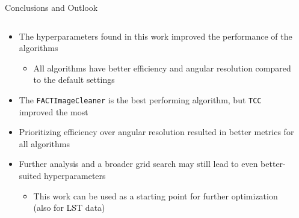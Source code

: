 \begin{frame}[label=summary]{Conclusions and Outlook}
    \begin{columns}
        \begin{column}{0.48\textwidth}
            \begin{itemize}
                \setlength\itemsep{2em}
                \item The hyperparameters found in this work improved the performance of the algorithms
                \begin{itemize}
                    \item [\rightarrow] All algorithms have better efficiency and angular resolution compared to the default settings
                \end{itemize}
                \item The \texttt{FACTImageCleaner} is the best performing algorithm, but \texttt{TCC} improved the most
                \item Prioritizing efficiency over angular resolution resulted in better metrics for all algorithms
                \item [\rightarrow] Further analysis and a broader grid search may still lead to even better-suited hyperparameters
                \begin{itemize}
                    \item [\rightarrow] This work can be used as a starting point for further optimization (also for LST data)
                \end{itemize}
            \end{itemize}
        \end{column}
        \begin{column}{0.48\textwidth}

        \end{column}
    \end{columns}
\end{frame}